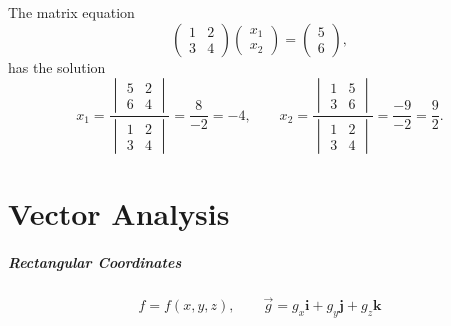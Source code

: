 \begin{Example}
  The matrix equation
  \[ \begin{pmatrix}
    1       &       2 \\
    3       &       4 
  \end{pmatrix}
  \begin{pmatrix}
    x_1 \\
    x_2
  \end{pmatrix}
  = 
  \begin{pmatrix}
    5 \\
    6
  \end{pmatrix},
  \]
  has the solution
  \[ x_1 = \frac{
    \begin{vmatrix}
      5       &       2 \\
      6       &       4
    \end{vmatrix} }{
    \begin{vmatrix}
      1       &       2 \\
      3       &       4
    \end{vmatrix} }
  = \frac{8}{-2} = -4, \qquad
  x_2 = \frac{
    \begin{vmatrix}
      1       &       5 \\
      3       &       6
    \end{vmatrix} }{
    \begin{vmatrix}
      1       &       2 \\
      3       &       4
    \end{vmatrix} }
  = \frac{-9}{-2} = \frac{9}{2}.
  \]
\end{Example}













\raggedbottom
\chapter{Vector Analysis}
\flushbottom

\paragraph{Rectangular Coordinates}

\[
f = f(x,y,z), \qquad \vec{g} = g_x \mathbf{i} + g_y \mathbf{j} + g_z \mathbf{k}
\]

